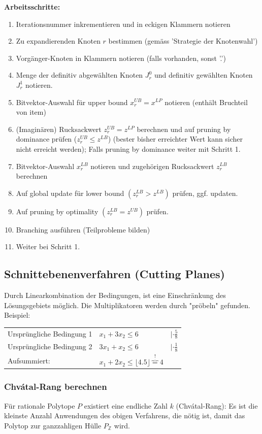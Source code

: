 \textbf{Arbeitsschritte:}
\begin{enumerate}
	\item Iterationsnummer inkrementieren und in eckigen Klammern notieren
	\item Zu expandierenden Knoten $r$ bestimmen (gemäss 'Strategie der Knotenwahl')
	\item Vorgänger-Knoten in Klammern notieren (falls vorhanden, sonst '.')
	\item Menge der definitiv abgewählten Knoten $J^0_r$ und definitiv gewählten Knoten $J^1_r$ notieren.
	\item Bitvektor-Auswahl für upper bound $x_r^{UB}=x^{LP}$ notieren (enthält Bruchteil von item)
	\item (Imaginären) Rucksackwert $z_r^{UB}=z^{LP}$ berechnen und auf pruning by dominance prüfen ($z_r^{UB}\le z^{LB}$) (bester bisher erreichter Wert kann sicher nicht erreicht werden); Falls pruning by dominance weiter mit Schritt 1.
	\item Bitvektor-Auswahl $x_r^{LB}$ notieren und zugehörigen Rucksackwert $z_r^{LB}$ berechnen
	\item Auf global update für lower bound $(z_r^{LB} > z^{LB})$ prüfen, ggf. updaten.
	\item Auf pruning by optimality $(z_r^{LB} = z^{UB})$ prüfen.
	\item Branching ausführen (Teilprobleme bilden)
	\item Weiter bei Schritt 1.
\end{enumerate}

\subsection{Schnittebenenverfahren (Cutting Planes) }  
	
	Durch Linearkombination der Bedingungen, ist eine Einschränkung des Lösungsgebiets möglich. Die Multiplikatoren werden durch "pröbeln" gefunden. Beispiel:
	
	\begin{tabular}{p{8cm} p{4cm} p{3cm}}
		Ursprüngliche Bedingung 1 & $x_1 + 3 x_2 \leq 6$ & $| \cdot \frac{5}{8}$\\
		Ursprüngliche Bedingung 2 & $3 x_1 + x_2 \leq 6$ & $| \cdot \frac{1}{8}$  \\
		Aufsummiert: & $x_1 + 2 x_2 \leq \lfloor 4.5 \rfloor \overbrace{=}^{!} 4$ \\
	\end{tabular}

\subsubsection{Chvátal-Rang berechnen }
Für rationale Polytope $P$ existiert eine endliche Zahl $k$ (Chvátal-Rang): Es ist die kleinste Anzahl Anwendungen des obigen Verfahrens, die nötig ist, damit das Polytop zur ganzzahligen Hülle $P_\mathbb{Z}$ wird.
